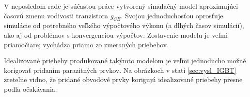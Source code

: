 V neposledom rade je súčasťou práce vytvorený  simulačný model aproximujúci časovú zmenu vodivosti tranzistora $g_{CE}$. Svojou jednoduchosťou oprosťuje simulácie od potrebného veľkého výpočtového výkonu (a dlhých časov simulácií), ako aj od problémov s konvergenciou výpočtov. Zostavenie modelu je veľmi priamočiare; vychádza priamo zo zmeraných priebehov.

Idealizované priebehy produkované takýmto modelom je veľmi jednoducho možné korigovať pridaním parazitných prvkov. Na obrázkoch v stati \ref{sec:vysl_IGBT} zreteľne vidno, že pridané obvodové prvky korigujú idealizované priebehy presne podľa očakávania.


